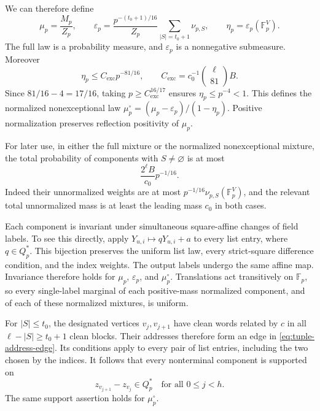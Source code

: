 We can therefore define
\begin{equation}
 \mu_p=\frac{M_p}{Z_p},\qquad
 \varepsilon_p=\frac{p^{-(t_0+1)/16}}{Z_p}
 \sum_{|S|=t_0+1}\nu_{p,S},\qquad
 \eta_p=\varepsilon_p(\mathbb F_p^V).
 \label{eq:tuple-normalized-laws}
\end{equation}
The full law is a probability measure, and
\(\varepsilon_p\) is a nonnegative submeasure.  Moreover
\begin{equation}
 \eta_p\le C_{\mathrm{exc}}p^{-81/16},\qquad
 C_{\mathrm{exc}}=c_0^{-1}\binom\ell{81}B.
 \label{eq:tuple-exception-bound}
\end{equation}
Since \(81/16-4=17/16\), taking
\(p\ge C_{\mathrm{exc}}^{16/17}\) ensures \(\eta_p\le p^{-4}<1\).
This defines the normalized nonexceptional law
\(\mu_p^\circ=(\mu_p-\varepsilon_p)/(1-\eta_p)\).
Positive normalization preserves reflection positivity of \(\mu_p\).

For later use, in either the full mixture or the normalized
nonexceptional mixture, the total probability of components with
\(S\ne\varnothing\) is at most
\begin{equation}
 \frac{2^\ell B}{c_0}p^{-1/16}.
 \label{eq:tuple-nonleading-mass}
\end{equation}
Indeed their unnormalized weights are at most
\(p^{-1/16}\nu_{p,S}(\mathbb F_p^V)\), and the relevant total
unnormalized mass is at least the leading mass \(c_0\) in both cases.

Each component is invariant under simultaneous square-affine changes
of field labels.  To see this directly, apply \(Y_{u,i}\mapsto qY_{u,i}+a\)
to every list entry, where \(q\in Q_p^*\).  This bijection preserves
the uniform list law, every strict-square difference condition, and
the index weights.  The output labels undergo the same affine map.
Invariance therefore holds for \(\mu_p\), \(\varepsilon_p\), and
\(\mu_p^\circ\).  Translations act transitively on \(\mathbb F_p\),
so every single-label marginal of each positive-mass normalized
component, and of each of these normalized mixtures, is uniform.

For \(|S|\le t_0\), the designated vertices \(v_j,v_{j+1}\) have
clean words related by \(c\) in all \(\ell-|S|\ge t_0+1\)
clean blocks.  Their addresses therefore form an edge in
\eqref{eq:tuple-address-edge}.  Its conditions apply to every pair
of list entries, including the two chosen by the indices.  It follows
that every nonterminal component is supported on
\begin{equation}
 z_{v_{j+1}}-z_{v_j}\in Q_p^*
 \quad\text{for all }0\le j<h.
 \label{eq:tuple-cycle-support}
\end{equation}
The same support assertion holds for \(\mu_p^\circ\).

